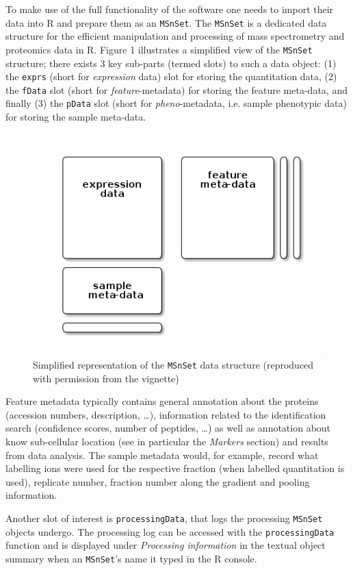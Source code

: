 To make use of the full functionality of the  software
one needs to import their data into R and prepare them as an
\texttt{MSnSet}. The \texttt{MSnSet} is a dedicated data structure for
the efficient manipulation and processing of mass spectrometry and
proteomics data in R. Figure 1 illustrates a simplified view of the
\texttt{MSnSet} structure; there exists 3 key sub-parts (termed slots)
to such a data object: (1) the \texttt{exprs} (short for
\textit{expression} data) slot for storing the quantitation data, (2)
the \texttt{fData} slot (short for \textit{feature}-metadata) for
storing the feature meta-data, and finally (3) the \texttt{pData} slot
(short for \textit{pheno}-metadata, i.e. sample phenotypic data) for
storing the sample meta-data.

\begin{figure}[!ht]
  \centering
  \includegraphics[width=.5\textwidth]{./Figures/msnset.png}
  \caption{Simplified representation of the \texttt{MSnSet} data
    structure (reproduced with permission from the 
    vignette)}
  \label{fig:msnset}
\end{figure}

Feature metadata typically contains general annotation about the
proteins (accession numbers, description, \ldots), information related
to the identification search (confidence scores, number of peptides,
\ldots) as well as annotation about know sub-cellular location (see in
particular the \textit{Markers} section) and results from data
analysis. The sample metadata would, for example, record what
labelling ions were used for the respective fraction (when labelled
quantitation is used), replicate number, fraction number along the
gradient and pooling information.

Another slot of interest is \texttt{processingData}, that logs the
processing \texttt{MSnSet} objects undergo. The processing log can be
accessed with the \texttt{processingData} function and is displayed
under \textit{Processing information} in the textual object summary
when an \texttt{MSnSet}'s name it typed in the R console.

